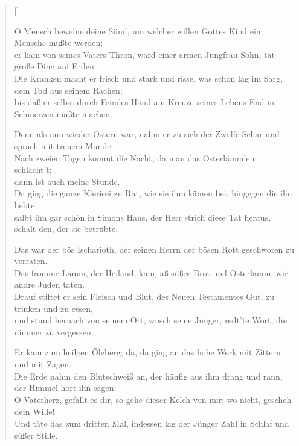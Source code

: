 \begin{center}
\settowidth{\versewidth}{O Mensch beweine deine Sünd, um welcher willen Gottes Kind ein Mensche mußte werden;}
\begin{verse}[\versewidth]

 O Mensch beweine deine Sünd, um welcher willen Gottes Kind ein Mensche mußte werden;\\
er kam von seines Vaters Thron, ward einer armen Jungfrau Sohn, tat große Ding auf Erden.\\
Die Kranken macht er frisch und stark und risse, was schon lag im Sarg, dem Tod aus seinem Rachen;\\
bis daß er selbst durch Feindes Händ am Kreuze seines Lebens End in Schmerzen mußte machen.

 Denn als nun wieder Ostern war, nahm er zu sich der Zwölfe Schar und sprach mit treuem Munde:\\
\flqq Nach zweien Tagen kommt die Nacht, da man das Osterlämmlein schlacht't;\\
dann ist auch meine Stunde.\frqq \\
Da ging die ganze Klerisei zu Rat, wie sie ihm kämen bei, hingegen die ihn liebte,\\
salbt ihn gar schön in Simons Haus, der Herr strich diese Tat heraus, schalt den, der sie betrübte.

 Das war der bös Ischarioth, der seinen Herrn der bösen Rott geschworen zu verraten.\\
Das fromme Lamm, der Heiland, kam, aß süßes Brot und Osterlamm, wie andre Juden taten.\\
Drauf stiftet er sein Fleisch und Blut, des Neuen Testamentes Gut, zu trinken und zu essen,\\
und stund hernach von seinem Ort, wusch seine Jünger, redt'te Wort, die nimmer zu vergessen.

 Er kam zum heilgen Öleberg; da, da ging an das hohe Werk mit Zittern und mit Zagen.\\
Die Erde nahm den Blutschweiß an, der häufig aus ihm drang und rann, der Himmel hört ihn sagen:\\
\flqq O Vaterherz, gefällt es dir, so gehe dieser Kelch von mir; wo nicht, gescheh dein Wille!\frqq \\
Und täte das zum dritten Mal, indessen lag der Jünger Zahl in Schlaf und süßer Stille.


\end{verse}
\end{center}
